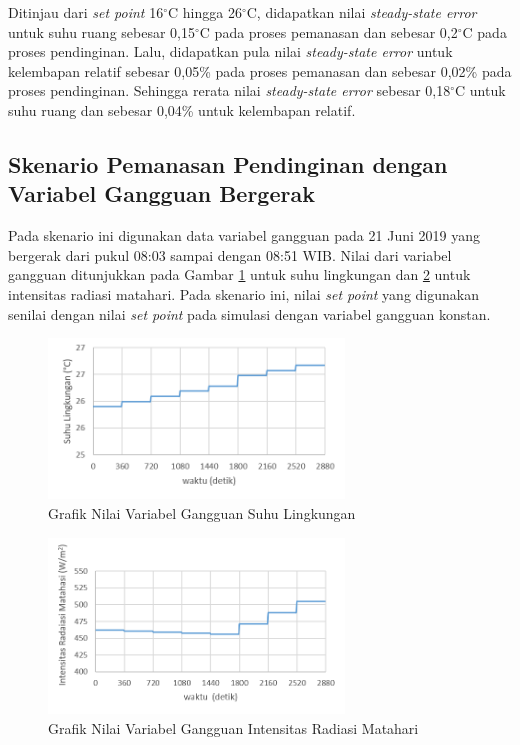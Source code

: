 Ditinjau dari \textit{set point} 16$^\circ$C hingga 26$^\circ$C, didapatkan nilai \textit{steady-state error} untuk suhu ruang sebesar 0,15$^\circ$C pada proses pemanasan dan sebesar 0,2$^\circ$C pada proses pendinginan. Lalu, didapatkan pula nilai \textit{steady-state error} untuk kelembapan relatif sebesar 0,05\% pada proses pemanasan dan sebesar 0,02\% pada proses pendinginan. Sehingga rerata nilai \textit{steady-state error} sebesar 0,18$^\circ$C untuk suhu ruang dan sebesar 0,04\% untuk kelembapan relatif.

\subsection{Skenario Pemanasan Pendinginan dengan Variabel Gangguan Bergerak}

Pada skenario ini digunakan data variabel gangguan pada 21 Juni 2019 yang bergerak dari pukul 08:03 sampai dengan 08:51 WIB. Nilai dari variabel gangguan ditunjukkan pada Gambar \ref{fig:5:Simulink2To} untuk suhu lingkungan dan \ref{fig:5:Simulink2RD} untuk intensitas radiasi matahari. Pada skenario ini, nilai \textit{set point} yang digunakan senilai dengan nilai \textit{set point} pada simulasi dengan variabel gangguan konstan.

\begin{figure}[!h]
	\centering
	\includegraphics[width=0.7\textwidth]{figures/Simulink2To}
	\caption{Grafik Nilai Variabel Gangguan Suhu Lingkungan}
	\label{fig:5:Simulink2To}
\end{figure}

\begin{figure}[!h]
	\centering
	\includegraphics[width=0.7\textwidth]{figures/Simulink2RD}
	\caption{Grafik Nilai Variabel Gangguan Intensitas Radiasi Matahari}
	\label{fig:5:Simulink2RD}
\end{figure}

